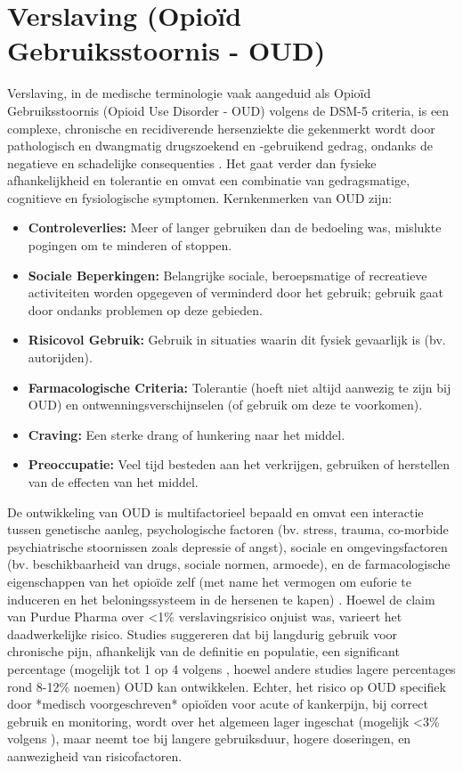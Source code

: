 \documentclass[11pt, a4paper]{report} %
\begin{document}
\section{Verslaving (Opioïd Gebruiksstoornis - OUD)}
Verslaving, in de medische terminologie vaak aangeduid als Opioïd Gebruiksstoornis (Opioid Use Disorder - OUD) volgens de DSM-5 criteria, is een complexe, chronische en recidiverende hersenziekte die gekenmerkt wordt door pathologisch en dwangmatig drugszoekend en -gebruikend gedrag, ondanks de negatieve en schadelijke consequenties \parencite{Cicero2017Review}. Het gaat verder dan fysieke afhankelijkheid en tolerantie en omvat een combinatie van gedragsmatige, cognitieve en fysiologische symptomen. Kernkenmerken van OUD zijn:
\begin{itemize}
    \item \textbf{Controleverlies:} Meer of langer gebruiken dan de bedoeling was, mislukte pogingen om te minderen of stoppen.
    \item \textbf{Sociale Beperkingen:} Belangrijke sociale, beroepsmatige of recreatieve activiteiten worden opgegeven of verminderd door het gebruik; gebruik gaat door ondanks problemen op deze gebieden.
    \item \textbf{Risicovol Gebruik:} Gebruik in situaties waarin dit fysiek gevaarlijk is (bv. autorijden).
    \item \textbf{Farmacologische Criteria:} Tolerantie (hoeft niet altijd aanwezig te zijn bij OUD) en ontwenningsverschijnselen (of gebruik om deze te voorkomen).
    \item \textbf{Craving:} Een sterke drang of hunkering naar het middel.
    \item \textbf{Preoccupatie:} Veel tijd besteden aan het verkrijgen, gebruiken of herstellen van de effecten van het middel.
\end{itemize}
De ontwikkeling van OUD is multifactorieel bepaald en omvat een interactie tussen genetische aanleg, psychologische factoren (bv. stress, trauma, co-morbide psychiatrische stoornissen zoals depressie of angst), sociale en omgevingsfactoren (bv. beschikbaarheid van drugs, sociale normen, armoede), en de farmacologische eigenschappen van het opioïde zelf (met name het vermogen om euforie te induceren en het beloningssysteem in de hersenen te kapen) \parencite{Cicero2017Review}. Hoewel de claim van Purdue Pharma over <1\% verslavingsrisico onjuist was, varieert het daadwerkelijke risico. Studies suggereren dat bij langdurig gebruik voor chronische pijn, afhankelijk van de definitie en populatie, een significant percentage (mogelijk tot 1 op 4 volgens \parencite{Gupta2010ChemistryOpioids}, hoewel andere studies lagere percentages rond 8-12\% noemen) OUD kan ontwikkelen. Echter, het risico op OUD specifiek door *medisch voorgeschreven* opioïden voor acute of kankerpijn, bij correct gebruik en monitoring, wordt over het algemeen lager ingeschat (mogelijk <3\% volgens \parencite{Hooten2021OpioidsChronicPain}), maar neemt toe bij langere gebruiksduur, hogere doseringen, en aanwezigheid van risicofactoren.
\end{document}
